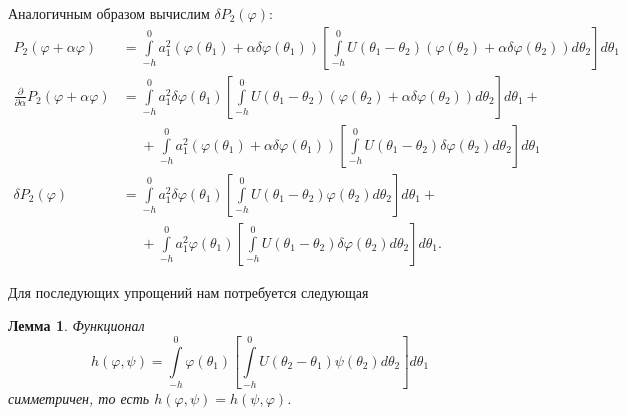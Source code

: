 \documentclass[a4paper,14pt]{article}
\newtheorem{lemma}{Лемма}
\theoremstyle{definition}
\begin{document}
Аналогичным образом вычислим $\delta P_2(\varphi)$:
\begin{equation*}
  \begin{aligned}
    P_2(\varphi + \alpha \varphi)
    &=
      \int\limits_{-h}^{0} a_1^2 (\varphi(\theta_1) + \alpha \delta \varphi(\theta_1))
      \left[
      \int\limits_{-h}^{0}
      U(\theta_1 - \theta_2) (\varphi(\theta_2) + \alpha \delta \varphi(\theta_2))
      d\theta_2
      \right]
      d\theta_1
    \\
    \frac{\partial }{\partial \alpha}
    P_2(\varphi + \alpha \varphi)
    &=
      \int\limits_{-h}^{0} a_1^2 \delta \varphi(\theta_1)
      \left[
      \int\limits_{-h}^{0}
      U(\theta_1 - \theta_2) (\varphi(\theta_2) + \alpha \delta \varphi(\theta_2))
      d\theta_2
      \right]
      d\theta_1
      + \\
    &\phantom{=}
      +
      \int\limits_{-h}^{0} a_1^2 (\varphi(\theta_1) + \alpha \delta \varphi(\theta_1))
      \left[
      \int\limits_{-h}^{0}
      U(\theta_1 - \theta_2) \delta \varphi(\theta_2)
      d\theta_2
      \right]
      d\theta_1
    \\
    \delta P_2(\varphi)
    &=
      \int\limits_{-h}^{0} a_1^2 \delta \varphi(\theta_1)
      \left[
      \int\limits_{-h}^{0}
      U(\theta_1 - \theta_2) \varphi(\theta_2)
      d\theta_2
      \right]
      d\theta_1
      + \\
    &\phantom{=}
      +
      \int\limits_{-h}^{0} a_1^2 \varphi(\theta_1)
      \left[
      \int\limits_{-h}^{0}
      U(\theta_1 - \theta_2) \delta \varphi(\theta_2)
      d\theta_2
      \right]
      d\theta_1.
  \end{aligned}
\end{equation*}

Для последующих упрощений нам потребуется следующая
\begin{lemma}\label{lemma:symmetric-functional}
  Функционал
  \begin{equation}
    \label{eq:lemma-1-functional}
    h(\varphi, \psi)
    =
    \int\limits_{-h}^{0} \varphi(\theta_1)
    \left[
      \int\limits_{-h}^{0} U(\theta_2 - \theta_1) \psi(\theta_2) d\theta_2
    \right]
    d\theta_1
  \end{equation}
  симметричен, то есть $h(\varphi, \psi) = h(\psi, \varphi)$.
\end{lemma}
\end{document}
